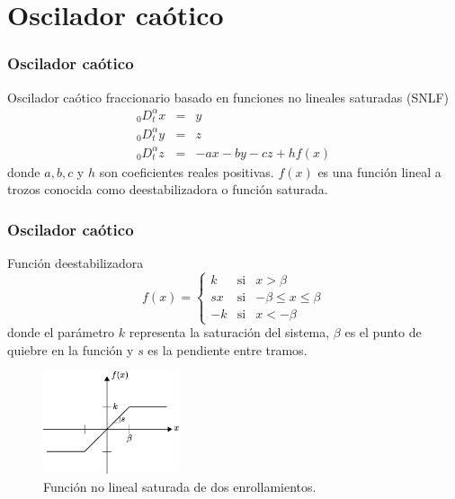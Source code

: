 \documentclass[10pt]{beamer}
\begin{document}
	\section{Oscilador caótico}
	\begin{frame}
		\frametitle{Oscilador caótico}
		\begin{block}{Oscilador caótico fraccionario basado en funciones no lineales saturadas (SNLF)}
			\begin{equation}
		 \begin{array}{lcl}
		_{0}D_{t}^{\alpha}x & = & y \\
		_{0}D_{t}^{\alpha}y  & = & z\\
		_{0}D_{t}^{\alpha}z  & = & -ax - by -cz + hf(x)
		\end{array}
		\label{ec:frac_osc_imp}
	\end{equation}
	donde  $a, b, c$ y $h$ son coeficientes reales positivas. $f(x)$ es una función lineal a trozos conocida como deestabilizadora o función saturada.
		\end{block}
	\end{frame}
	\begin{frame}
		\frametitle{Oscilador caótico}
		\begin{block}{Función deestabilizadora}
			 \begin{equation}
		f(x) = \left\{ \begin{array}{lcl}
		k & \mathrm{si} & x > \beta \\
		sx & \mathrm{si} & - \beta \leq x \leq \beta  \\
		-k & \mathrm{si} & x < -\beta
		\end{array}
		\right.
		\label{ec:saturacion}
	\end{equation}
	donde el parámetro $k$ representa la saturación del sistema, $\beta$ es el punto de quiebre en la función y $s$ es la pendiente entre tramos.
		\begin{figure}[!ht]
		\caption{Función no lineal saturada de dos enrollamientos.} 
		\label{fig:Z1_saturacion}
		\centering
		\includegraphics[width=4cm]{../imagenes/Z1_saturacion.eps}
	\end{figure}	
		\end{block}
	\end{frame}
\end{document}
